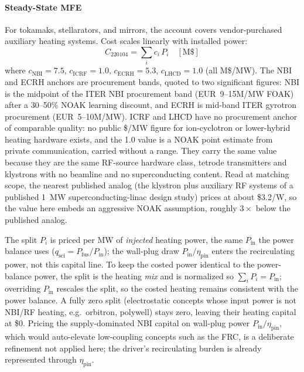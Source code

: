 \documentclass{article}
\begin{document}
\paragraph{Steady-State MFE}
For tokamaks, stellarators, and mirrors, the account covers
vendor-purchased auxiliary heating systems. Cost scales linearly with
installed power:
\begin{equation}
C_{220104} = \sum_i c_i \, P_i \quad [\text{M\$}]
\end{equation}
where $c_{\text{NBI}} = 7.5$, $c_{\text{ICRF}} = 1.0$,
$c_{\text{ECRH}} = 5.3$, $c_{\text{LHCD}} = 1.0$ (all M\$/MW).
The NBI and ECRH anchors are procurement bands, quoted to two
significant figures: NBI is the midpoint of the ITER NBI procurement
band (EUR~9--15M/MW FOAK) after a 30--50\% NOAK learning discount, and
ECRH is mid-band ITER gyrotron procurement (EUR~5--10M/MW). ICRF and
LHCD have no procurement anchor of comparable quality: no public
\$/MW figure for ion-cyclotron or lower-hybrid heating hardware
exists, and the 1.0 value is a NOAK point estimate from private
communication, carried without a range. They carry the same value
because they are the same RF-source hardware class, tetrode
transmitters and klystrons with no beamline and no superconducting
content. Read at matching scope, the nearest published analog (the
klystron plus auxiliary RF systems of a published 1~MW
superconducting-linac design study) prices at about \$3.2/W, so the
value here embeds an aggressive NOAK assumption, roughly $3\times$
below the published analog.

The split $P_i$ is priced per MW of \emph{injected} heating power, the
same $P_{\text{in}}$ the power balance uses ($q_{\text{sci}} =
P_{\text{fus}}/P_{\text{in}}$); the wall-plug draw
$P_{\text{in}}/\eta_{\text{pin}}$ enters the recirculating power, not this
capital line. To keep the costed power identical to the power-balance
power, the split is the heating \emph{mix} and is normalized so
$\sum_i P_i = P_{\text{in}}$; overriding $P_{\text{in}}$ rescales the
split, so the costed heating remains consistent with the power balance. A fully zero
split (electrostatic concepts whose input power is not NBI/RF heating,
e.g.\ orbitron, polywell) stays zero, leaving their heating capital at
\$0. Pricing the supply-dominated NBI capital on wall-plug power
$P_{\text{in}}/\eta_{\text{pin}}$, which would auto-elevate low-coupling
concepts such as the FRC, is a deliberate refinement not applied here;
the driver's recirculating burden is already represented through
$\eta_{\text{pin}}$.
\end{document}
